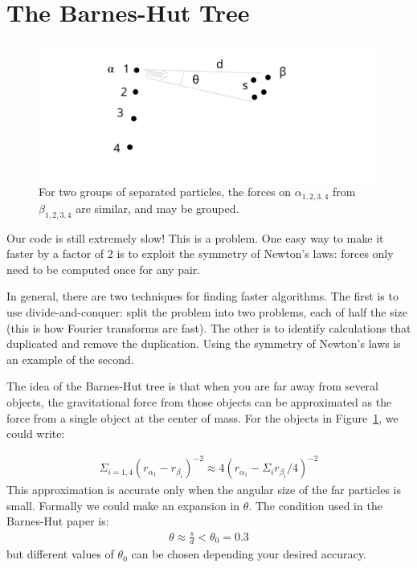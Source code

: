 \documentclass[12pt]{article}
\begin{document}
\section{The Barnes-Hut Tree}

\begin{figure}
\includegraphics[scale=0.7]{bhtree.png}
\centering
\caption{For two groups of separated particles, the forces on $\alpha_{1,2,3,4}$ from $\beta_{1,2,3,4}$ are similar, and may be grouped.}
\label{fig:particles}
\end{figure}

Our code is still extremely slow! This is a problem. One easy way to make it faster by a factor of $2$ is to exploit the symmetry of Newton's laws: forces only need to be computed once for any pair.

In general, there are two techniques for finding faster algorithms. The first is to use divide-and-conquer: split the problem into two problems, each of half the size (this is how Fourier transforms are fast). The other is to identify calculations that duplicated and remove the duplication. Using the symmetry of Newton's laws is an example of the second.

The idea of the Barnes-Hut tree is that when you are far away from several objects, the gravitational force from those objects can be approximated as the force from a single object at the center of mass. For the objects in Figure~\ref{fig:particles}, we could write:

\begin{align}
 \Sigma_{i=1,4} (r_{\alpha_1} - r_{\beta_i})^{-2} \approx 4 (r_{\alpha_1} - \Sigma_i r_{\beta_i} / 4)^{-2}
\end{align}
This approximation is accurate only when the angular size of the far particles is small. Formally we could make an expansion in $\theta$. The condition used in the Barnes-Hut paper is:
\begin{align}
\theta \approx \frac{s}{d} < \theta_0 = 0.3
\end{align}
but different values of $\theta_0$ can be chosen depending your desired accuracy.
\end{document}
